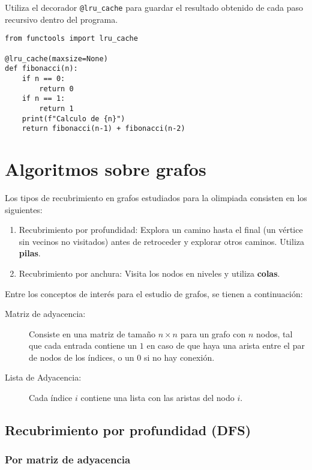 \documentclass[12pt,letterpaper]{article}
\begin{document}
Utiliza el decorador \texttt{@lru\_cache} para guardar el resultado obtenido de cada paso recursivo dentro del programa.

\begin{verbatim}
from functools import lru_cache

@lru_cache(maxsize=None)
def fibonacci(n):
    if n == 0:
        return 0
    if n == 1:
        return 1
    print(f"Calculo de {n}")
    return fibonacci(n-1) + fibonacci(n-2)
\end{verbatim}


\section{Algoritmos sobre grafos}

Los tipos de recubrimiento en grafos estudiados para la olimpiada consisten en los siguientes:

\begin{enumerate}
    \item Recubrimiento por profundidad: Explora un camino hasta el final (un vértice sin vecinos no visitados) antes de retroceder y explorar otros caminos. Utiliza \textbf{pilas}.
    \item Recubrimiento por anchura: Visita los nodos en niveles y utiliza \textbf{colas}.
\end{enumerate}

Entre los conceptos de interés para el estudio de grafos, se tienen a continuación:
\begin{description}
    \item[Matriz de adyacencia:] Consiste en una matriz de tamaño $n \times n$ para un grafo con $n$ nodos, tal que cada entrada contiene un $1$ en caso de que haya una arista entre el par de nodos de los índices, o un $0$ si no hay conexión.
    \item[Lista de Adyacencia:] Cada índice $i$ contiene una lista con las aristas del nodo $i$.
\end{description}

\subsection{Recubrimiento por profundidad (DFS)}

\subsubsection{Por matriz de adyacencia}
\end{document}
